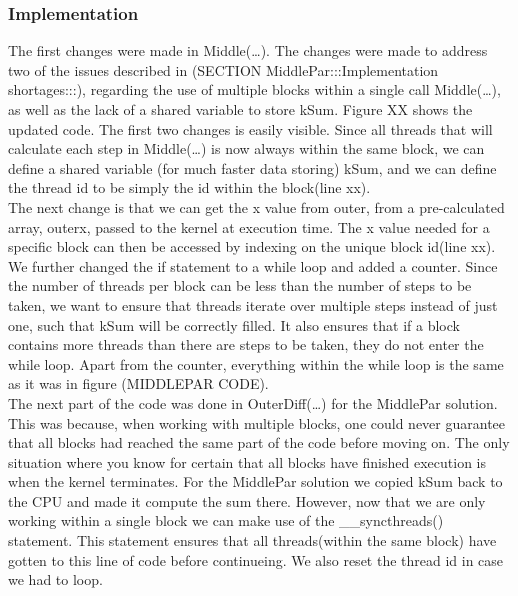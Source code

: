 \subsubsection{Implementation} \hfill

The first changes were made in Middle(…). The changes were made to address two of the issues described in (SECTION MiddlePar:::Implementation shortages:::), regarding the use of multiple blocks within a single call Middle(…), as well as the lack of a shared variable to store kSum. Figure XX shows the updated code. The first two changes is easily  visible. Since all threads that will calculate each step in Middle(…) is now always within the same block, we can define a shared variable (for much faster data storing) kSum, and we can define the thread id to be simply the id within the block(line xx).\\

The next change is that we can get the x value from outer, from a pre-calculated array, outerx, passed to the kernel at execution time. The x value needed for a specific block can then be accessed by indexing on the unique block id(line xx).\\

We further changed the if statement to a while loop and added a counter. Since the number of threads per block can be less than the number of steps to be taken, we want to ensure that threads iterate over multiple steps instead of just one, such that kSum will be correctly filled. It also ensures that if a block contains more threads than there are steps to be taken, they do not enter the while loop. Apart from the counter, everything within the while loop is the same as it was in figure (MIDDLEPAR CODE).\\

The next part of the code was done in OuterDiff(…) for the MiddlePar solution. This was because, when working with multiple blocks, one could never guarantee that all blocks had reached the same part of the code before moving on. The only situation where you know for certain that all blocks have finished execution is when the kernel terminates. For the MiddlePar solution we copied kSum back to the CPU and made it compute the sum there. However, now that we are only working within a single block we can make use of the \_\_syncthreads() statement. This statement ensures that all threads(within the same block) have gotten to this line of code before continueing. We also reset the thread id in case we had to loop. \\

